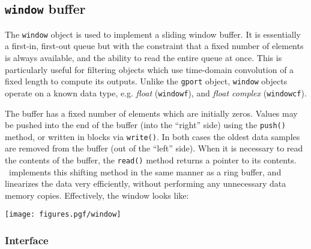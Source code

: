 \subsection{{\tt window} buffer}
\label{module:buffer:window}
The {\tt window} object is used to implement a sliding window buffer.
It is essentially a first-in, first-out queue but with the constraint that a
fixed number of elements is always available, and the ability to read the
entire queue at once.
This is particularly useful for filtering objects which use time-domain
convolution of a fixed length to compute its outputs.
Unlike the {\tt gport} object, {\tt window} objects operate on a known data
type, e.g.
{\it float} ({\tt windowf}), and
{\it float complex} ({\tt windowcf}).

The buffer has a fixed number of elements which are initially zeros.
Values may be pushed into the end of the buffer (into the ``right'' side)
using the {\tt push()} method, or written in blocks via {\tt write()}.
In both cases the oldest data samples are removed from the buffer (out of the
``left'' side).
When it is necessary to read the contents of the buffer, the {\tt read()}
method returns a pointer to its contents.
\liquid\ implements this shifting method in the same manner as a ring buffer,
and linearizes the data very efficiently, without performing any unnecessary
data memory copies.
Effectively, the window looks like:

\begin{centering}
\texttt{[image: figures.pgf/window]}
\end{centering}

\subsubsection{Interface}
\label{module:buffer:window:interface}

